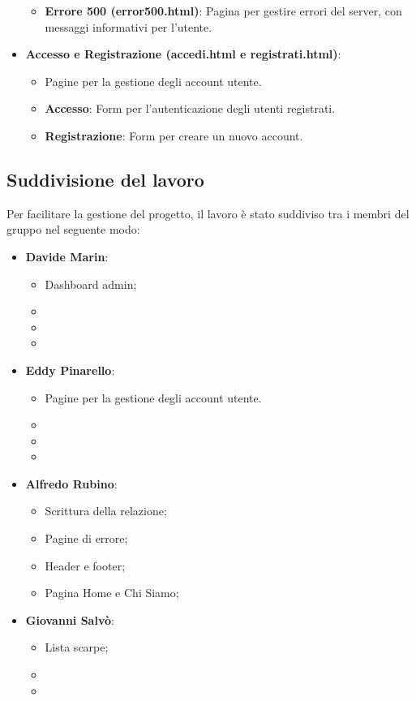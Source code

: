 \documentclass[a4paper, 12pt]{article}
\begin{document}
\begin{justify}
\begin{itemize}
\begin{itemize}
            \item \textbf{Errore 500 (error500.html)}: Pagina per gestire errori del server, con messaggi informativi per l'utente.
        \end{itemize}
    \item \textbf{Accesso e Registrazione (accedi.html e registrati.html)}:
        \begin{itemize}
            \item Pagine per la gestione degli account utente.
            \item \textbf{Accesso}: Form per l'autenticazione degli utenti registrati.
            \item \textbf{Registrazione}: Form per creare un nuovo account.
        \end{itemize}
\end{itemize}

\subsection{Suddivisione del lavoro}
Per facilitare la gestione del progetto, il lavoro è stato suddiviso tra i membri del gruppo nel seguente modo:
\begin{itemize}
    \item \textbf{Davide Marin}: 
        \begin{itemize}
            \item Dashboard admin;
            \item
            \item
            \item 
        \end{itemize}
    \item \textbf{Eddy Pinarello}:
        \begin{itemize}
            \item Pagine per la gestione degli account utente.
            \item
            \item
            \item
        \end{itemize}
    \item \textbf{Alfredo Rubino}:
        \begin{itemize}
            \item Scrittura della relazione;
            \item Pagine di errore;
            \item Header e footer;
            \item Pagina Home e Chi Siamo;
        \end{itemize}
    \item \textbf{Giovanni Salvò}:
        \begin{itemize}
            \item Lista scarpe;
            \item
            \item
        \end{itemize}
\end{itemize}



\end{justify}
\end{document}
